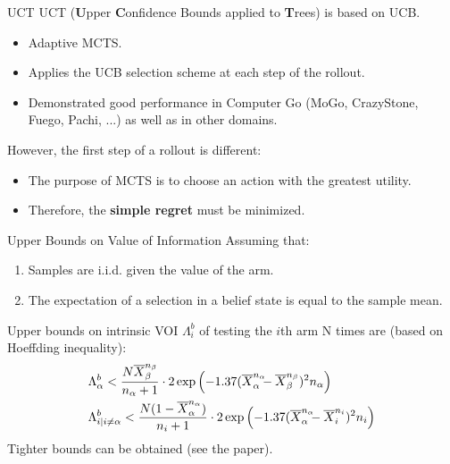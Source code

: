 \documentclass{beamer}
\begin{document}
\begin{frame}{UCT}
UCT ({\bf U}pper {\bf C}onfidence Bounds applied to {\bf T}rees) is 
based on UCB.
\begin{itemize}
\item Adaptive MCTS.
\item Applies the UCB selection scheme at each step of the rollout.
\item Demonstrated good performance in Computer Go (MoGo, CrazyStone, Fuego,
  Pachi, ...) as well as in other domains.
\end{itemize}
However, the first step of a rollout is different:
\begin{itemize}
\item The purpose of MCTS is to choose an action with the greatest utility.
\item Therefore, the {\bf simple regret} must be minimized.
\end{itemize}
\end{frame}

\begin{frame}{Upper Bounds on Value of Information}
Assuming that:
\begin{enumerate}
\item Samples are i.i.d. given the value of the arm.
\item The expectation of a selection in a belief state is equal to the sample mean.
\end{enumerate}
Upper bounds on intrinsic VOI $\Lambda^b_i$ of testing the $i$th arm N
times are (based on Hoeffding inequality):
\begin{align*}
  \Lambda&_\alpha^b < \frac {N\overline X_\beta^{n_\beta}}
  {n_\alpha+1}\cdot 2\exp\left(- 1.37(\overline X_\alpha^{n_\alpha}\hspace{-0.5em} - \overline X_\beta^{n_\beta})^2 n_\alpha\right)\\
  \Lambda&_{i|i\ne\alpha}^b <  \frac {N(1-\overline
    X_\alpha^{n_\alpha})} {n_i+1}\cdot 2\exp\left(- 1.37(\overline X_\alpha^{n_\alpha}\hspace{-0.5em} - \overline X_i^{n_i})^2 n_i\right)
\end{align*}
Tighter bounds can be obtained (see the paper).
\end{frame}
\end{document}
